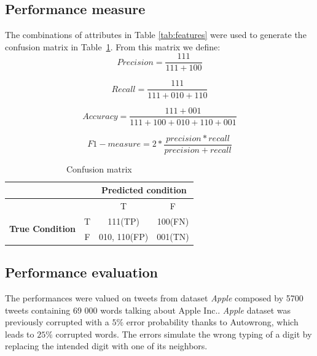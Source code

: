 \documentclass[12pt]{article}
\begin{document}
\subsection{Performance measure}
The combinations of attributes in Table \ref{tab:features} were used to generate
the confusion matrix in Table~\ref{tab:confusionM}. From this matrix we define:
\begin{equation}Precision = \frac{111}{111 + 100}\end{equation}

\begin{equation}Recall = \frac{111}{111 + 010 + 110}\end{equation}

\begin{equation}Accuracy = \frac{111 + 001}{111 + 100 + 010 + 110 +
001}\end{equation}

\begin{equation}F1-measure = 2 * \frac{precision * recall}{precision +
recall}\end{equation}







\begin{table}[htbp]
  \centering
  \setlength{\tabcolsep}{1em}
  \renewcommand{\arraystretch}{1.5}
    \begin{tabular}{cccc}
    \toprule
          &       & \multicolumn{2}{c}{\textbf{Predicted condition}} \\
    \midrule
          &       & T     & F \\
    \multicolumn{1}{c}{\multirow{2}[0]{*}{\textbf{True Condition}}} & T     &
    111(TP) & 100(FN) \\
    \multicolumn{1}{c}{} & F     & {010, 110(FP)} & 001(TN) \\
    \bottomrule \end{tabular}%
    \caption{Confusion matrix}
  \label{tab:confusionM}%
\end{table}%

%
\subsection{Performance evaluation}
The performances were valued on tweets from dataset \emph{Apple} composed by
5700 tweets containing 69 000 words talking about Apple Inc..
\emph{Apple} dataset was previously corrupted with a $5\%$ error
probability thanks to Autowrong, which leads to $25\%$ corrupted words.
The errors simulate the wrong typing of a digit by replacing the intended digit with one of its neighbors.
\end{document}
